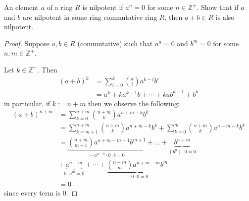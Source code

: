 \begin{prob}
    An element $a$ of a ring $R$ is nilpotent if $a^n = 0$ for some 
    $n \in \mathbb Z^+$. Show that if $a$ and $b$ are nilpotent 
    in some ring commutative ring $R$, then $a+b \in R$ is 
    also nilpotent. 
\end{prob}
\begin{proof}
    Suppose $a,b \in R$ (commutative) such that 
    $a^n = 0$ and $b^m = 0$ for some $n,m \in \mathbb Z^+$.

    Let $k \in \mathbb Z^+$. Then
    \begin{align*}
        (a+b)^k &= \displaystyle\sum_{i=0}^k \binom{k}{i}a^{k-i}b^i \\
                &= a^k + ka^{k-1}b + \cdots + kab^{k-1} + b^k
    \end{align*}
    in particular, if $k := n + m$ then we observe the following: 
    \begin{align*}
        (a+b)^{n+m} &=  
        \displaystyle\sum_{k=0}^{n+m}\binom{n+m}{k}a^{n+m-k}b^k \\ 
        &= 
        \displaystyle\sum_{k=m + 1}^{n+m}\binom{n+m}{k}a^{n+m-k}b^k +
        \displaystyle\sum_{k=0}^{m}\binom{n+m}{k}a^{n+m-k}b^k \\ 
        &= \underbrace{\binom{n+m}{m+1}a^{n+m-m-1}b^{m+1}}_{
        \cdots \; a^{n-1}\cdot0\cdot b = 0} + 
        \ldots + 
        \underbrace{b^{n+m}}_{(b^n)\cdot 0 = 0} \\ 
        &+ \underbrace{a^{n+m}}_{0 \cdot a^m = 0} + \cdots + 
        \underbrace{\binom{n+m}{m}a^{n+m-m}b^{m}}_{\cdots \; 
        0 \cdot 0 = 0} \\ 
        &= 0
    \end{align*}
    since every term is $0$. 
\end{proof}

